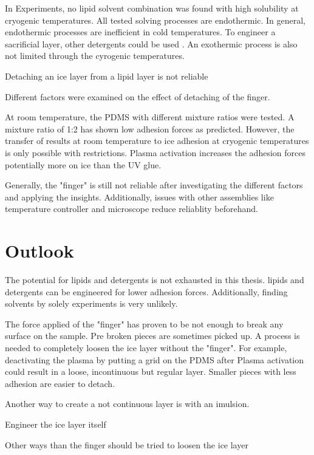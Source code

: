In Experiments, no lipid solvent combination was found with high solubility at cryogenic temperatures. All tested solving processes are endothermic. In general, endothermic processes are inefficient in cold temperatures. To engineer a sacrificial layer, other detergents could be used \cite{SigmaAldrich.2023}. An exothermic process is also not limited through the cyrogenic temperatures.

Detaching an ice layer from a lipid layer is not reliable 

Different factors were examined on the effect of detaching of the finger. 

At room temperature, the PDMS with different mixture ratios were tested. A mixture ratio of 1:2 has shown low adhesion forces as predicted. However, the transfer of results at room temperature to ice adhesion at cryogenic temperatures is only possible with restrictions. Plasma activation increases the adhesion forces potentially more on ice than the UV glue. 

Generally, the "finger" is still not reliable after investigating the different factors and applying the insights. Additionally, issues with other assemblies like temperature controller and microscope reduce reliablity beforehand. 


\section{Outlook}

The potential for lipids and detergents is not exhausted in this thesis. lipids and detergents can be engineered for lower adhesion forces. Additionally, finding solvents by solely experiments is very unlikely. 

The force applied of the "finger" has proven to be not enough to break any surface on the sample. Pre broken pieces are sometimes picked up. A process is needed to completely loosen the ice layer without the "finger". For example, deactivating the plasma by putting a grid on the PDMS after Plasma activation could result in a loose, incontinuous but regular layer. Smaller pieces with less adhesion are easier to detach.

Another way to create a not continuous layer is with an imulsion. 

Engineer the ice layer itself

Other ways than the finger should be tried to loosen the ice layer
